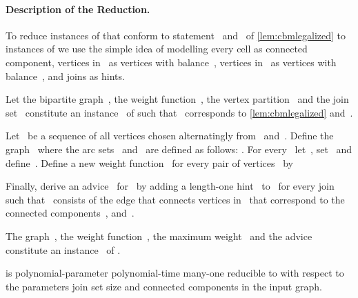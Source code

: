 \paragraph{Description of the Reduction.}
To reduce instances of \pCBMs{} that conform to statement~ and~ of \autoref{lem:cbmlegalized} to instances of \pWMEEAs{} we use the simple idea of modelling every cell as connected component, vertices in~ as vertices with balance~, vertices in~ as vertices with balance~, and joins as hints.
\begin{construction}\label{cons:redcbmtoeea}
  Let the bipartite graph~, the weight function~, the vertex partition~ and the join set~ constitute an instance~ of \pCBMs{} such that~ corresponds to \autoref{lem:cbmlegalized} and~.

  Let~ be a sequence of all vertices chosen alternatingly from~ and~. Define the graph~ where the arc sets~ and~ are defined as follows: . For every~ let~, set~ and define~. Define a new weight function~ for every pair of vertices~ by

Finally, derive an advice~ for~ by adding a length-one hint~ to~ for every join~ such that~ consists of the edge that connects vertices in~ that correspond to the connected components~, and~.

The graph~, the weight function~, the maximum weight~ and the advice~ constitute an instance~ of \pWMEEAs{}.
\end{construction}
\begin{theorem}\label{the:redcbmtowmeea}
  \pCBM{} is polynomial-parameter polynomial-time many-one reducible to \pWMEEA{} with respect to the parameters join set size and connected components in the input graph.
\end{theorem}
